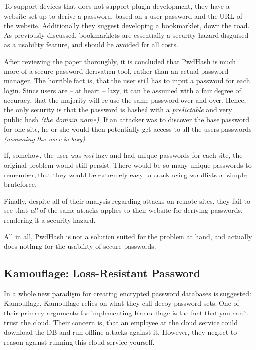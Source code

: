 			To support devices that does not support plugin development, they have a website set up to derive a password, based on a user password and the URL of the website. Additionally they suggest developing a bookmarklet, down the road. As previously discussed, bookmarklets are essentially a security hazard disguised as a usability feature, and should be avoided for all costs.


			After reviewing the paper thoroughly, it is concluded that PwdHash is much more of a secure password derivation tool, rather than an actual password manager. The horrible fact is, that the user still has to input a password for each login. Since users are -- at heart -- lazy, it can be assumed with a fair degree of accuracy, that the majority will re-use the same password over and over. Hence, the only security is that the password is hashed with a \emph{predictable} and very public hash \emph{(the domain name)}. If an attacker was to discover the base password for one site, he or she would then potentially get access to all the users passwords \emph{(assuming the user is lazy)}.

			If, somehow, the user was \emph{not} lazy and had unique passwords for each site, the original problem would still persist. There would be so many unique passwords to remember, that they would be extremely easy to crack using wordlists or simple bruteforce.

			Finally, despite all of their analysis regarding attacks on remote sites, they fail to see that \emph{all} of the same attacks applies to their website for deriving passwords, rendering it a security hazard.

			All in all, PwdHash is not a solution suited for the problem at hand, and actually does nothing for the usability of secure passwords.

		\subsection*{Kamouflage: Loss-Resistant Password}
			In \cite{kamouflage} a whole new paradigm for creating encrypted password databases is suggested: Kamouflage. Kamouflage relies on what they call decoy password sets. One of their primary arguments for implementing Kamouflage is the fact that you can't trust the cloud. Their concern is, that an employee at the cloud service could download the DB and run offline attacks against it. However, they neglect to reason against running this cloud service yourself.


